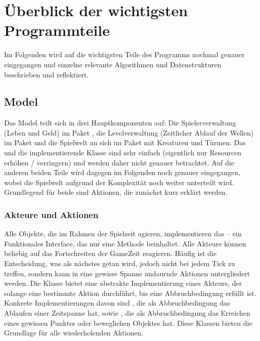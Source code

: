 \section{Überblick der wichtigsten Programmteile} %
\label{sec:überblick_der_wichtigsten_programmteile}

Im Folgenden wird auf die wichtigsten Teile des Programms nochmal genauer eingegangen und einzelne relevante Algorithmen und Datenstrukturen beschrieben und reflektiert.

\subsection{Model} %
\label{sub:model}
Das Model teilt sich in drei Hauptkomponenten auf: Die Spielerverwaltung (Leben und Geld) im Paket , die Levelverwaltung (Zeitlicher Ablauf der Wellen) im Paket  und die Spielwelt an sich im Paket  mit Kreaturen und Türmen. Das  und die implementierende Klasse  sind sehr einfach (eigentlich nur Resourcen erhöhen / verringern) und werden daher nicht genauer betrachtet. Auf die anderen beiden Teile wird dagegen im Folgenden noch genauer eingegangen, wobei die Spielwelt aufgrund der Komplexität noch weiter unterteilt wird. Grundlegend für beide sind Aktionen, die zunächst kurz erklärt werden.

\subsubsection{Akteure und Aktionen} %
\label{ssub:aktionen}
Alle Objekte, die im Rahmen der Spielzeit agieren, implementieren das  -- ein Funktionales Interface, das nur eine Methode  beinhaltet. Alle Akteure können beliebig auf das Fortschreiten der GameZeit reagieren. Häufig ist die Entscheidung, was als nächstes getan wird, jedoch nicht bei jedem Tick zu treffen, sondern kann in eine gewisse Spanne andaurnde Aktionen untergliedert werden. Die Klasse  bietet eine abstrakte Implementierung eines Akteurs, der solange eine bestimmte Aktion durchführt, bis eine Abbruchbedingung erfüllt ist. Konkrete Implementierungen davon sind , die als Abbruchbedingung das Ablaufen einer Zeitspanne hat, sowie , die als Abbruchbedingung das Erreichen eines gewissen Punktes oder beweglichen Objektes hat. Diese Klassen bieten die Grundlage für alle wiederholenden Aktionen.
